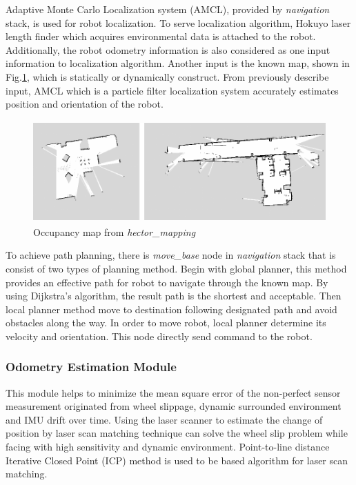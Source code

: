 \documentclass{llncs}
\begin{document}
Adaptive Monte Carlo Localization system (AMCL), provided by \textit{navigation} stack, is used for robot localization. To serve localization algorithm, Hokuyo laser length finder which acquires environmental data is attached to the robot. Additionally, the robot odometry information is also considered as one input information to localization algorithm. Another input is the known map, shown in Fig.\ref{fig:hector}, which is statically or dynamically construct. From previously describe input, AMCL which is a particle filter localization system accurately estimates position and orientation of the robot.

\begin{figure}
\centering
\includegraphics[height=3.9cm]{hector_map}
\caption{Occupancy map from \textit{hector\_mapping}}
\label{fig:hector}
\end{figure}

To achieve path planning, there is \textit{move\_base} node in \textit{navigation} stack that is consist of two types of planning method. Begin with global planner, this method provides an effective path for robot to navigate through the known map. By using Dijkstra's algorithm, the result path is the shortest and acceptable. Then local planner method move to destination following designated path and avoid obstacles along the way. In order to move robot, local planner determine its velocity and orientation. This node directly send command to the robot.

\subsubsection{Odometry Estimation Module}

This module helps to minimize the mean square error of the non-perfect sensor measurement originated from wheel slippage, dynamic surrounded environment and IMU drift over time. Using the laser scanner to estimate the change of position by laser scan matching technique can solve the wheel slip problem while facing with high sensitivity and dynamic environment. Point-to-line distance Iterative Closed Point (ICP) method is used to be based algorithm for laser scan matching.
\end{document}
